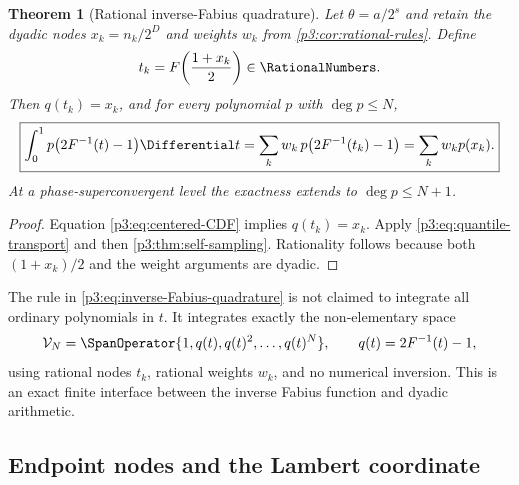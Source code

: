 \documentclass[11pt,oneside]{article}
\numberwithin{equation}{section}
\newtheorem{theorem}{Theorem}[section]
\theoremstyle{definition}
\theoremstyle{remark}
\begin{document}
\begin{theorem}[Rational inverse-Fabius quadrature]
\label{p3:thm:inverse-Fabius-quadrature}
Let $\theta=a/2^s$ and retain the dyadic nodes $x_k=n_k/2^D$ and weights $w_k$ from \cref{p3:cor:rational-rules}.  Define
\begin{equation}
 t_k=F\!\left(\frac{1+x_k}{2}\right)\in\RationalNumbers.
 \label{p3:eq:inverse-Fabius-nodes}
\end{equation}
Then $q(t_k)=x_k$, and for every polynomial $p$ with $\deg p\le N$,
\begin{equation}
 \boxed{\displaystyle
 \int_0^1p\bigl(2F^{-1}(t)-1\bigr)\Differential t
 =\sum_k w_k\,p\bigl(2F^{-1}(t_k)-1\bigr)
 =\sum_k w_kp(x_k).}
 \label{p3:eq:inverse-Fabius-quadrature}
\end{equation}
At a phase-superconvergent level the exactness extends to $\deg p\le N+1$.
\end{theorem}

\begin{proof}
Equation \eqref{p3:eq:centered-CDF} implies $q(t_k)=x_k$.  Apply \eqref{p3:eq:quantile-transport} and then \cref{p3:thm:self-sampling}.  Rationality follows because both $(1+x_k)/2$ and the weight arguments are dyadic.
\end{proof}

\begin{remark}
The rule in \eqref{p3:eq:inverse-Fabius-quadrature} is not claimed to integrate all ordinary polynomials in $t$.  It integrates exactly the non-elementary space
\begin{equation}
 \mathcal V_N
 =\SpanOperator\{1,q(t),q(t)^2,\ldots,q(t)^N\},
 \qquad q(t)=2F^{-1}(t)-1,
 \label{p3:eq:inverse-exactness-space}
\end{equation}
using rational nodes $t_k$, rational weights $w_k$, and no numerical inversion.  This is an exact finite interface between the inverse Fabius function and dyadic arithmetic.
\end{remark}

\subsection{Endpoint nodes and the Lambert coordinate}
\end{document}
